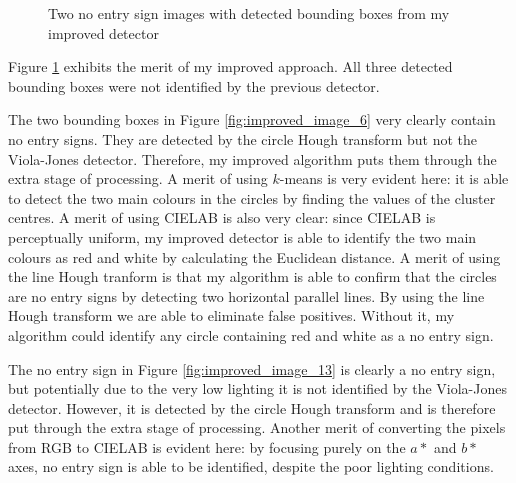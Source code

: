\documentclass[twocolumn, 10pt, a4paper]{article}
\begin{document}
\begin{figure}[H]
  \vspace{-4.5em}
  \centering
  \hfill
  \hfill
  \caption{Two no entry sign images with detected bounding boxes from my improved detector}\label{fig:improved_images}
\end{figure}

Figure \ref{fig:improved_images} exhibits the merit of my improved approach.
All three detected bounding boxes were not identified by the previous detector.

The two bounding boxes in Figure \ref{fig:improved_image_6} very clearly contain no entry signs.
They are detected by the circle Hough transform but not the Viola-Jones detector.
Therefore, my improved algorithm puts them through the extra stage of processing.
A merit of using $k$-means is very evident here: it is able to detect the two main colours in the circles by finding the values of the cluster centres.
A merit of using CIELAB is also very clear: since CIELAB is perceptually uniform, my improved detector is able to identify the two main colours as red and white by calculating the Euclidean distance.
A merit of using the line Hough tranform is that my algorithm is able to confirm that the circles are no entry signs by detecting two horizontal parallel lines.
By using the line Hough transform we are able to eliminate false positives.
Without it, my algorithm could identify any circle containing red and white as a no entry sign.

The no entry sign in Figure \ref{fig:improved_image_13} is clearly a no entry sign, but potentially due to the very low lighting it is not identified by the Viola-Jones detector.
However, it is detected by the circle Hough transform and is therefore put through the extra stage of processing.
Another merit of converting the pixels from RGB to CIELAB is evident here: by focusing purely on the $a*$ and $b*$ axes, no entry sign is able to be identified, despite the poor lighting conditions.
\end{document}
